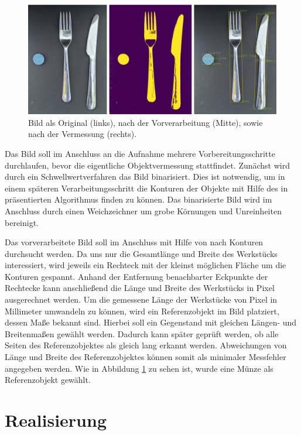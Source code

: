 \documentclass[twocolumn,10pt]{asme2ej}
\begin{document}
\begin{figure}
	\includegraphics[scale=0.07	]{output.png}
	\caption[center]{Bild als Original (links), nach der Vorverarbeitung (Mitte), sowie nach der Vermessung (rechts). }
	\label{fig:intro}
\end{figure}


Das Bild soll im Anschluss an die Aufnahme mehrere Vorbereitungsschritte durchlaufen, bevor die eigentliche Objektvermessung stattfindet. Zunächst wird durch ein Schwellwertverfahren das Bild binarisiert. Dies ist notwendig, um in einem späteren Verarbeitungsschritt die Konturen der Objekte mit Hilfe des in \cite{Suzuki1985TopologicalSA} präsentierten Algorithmus finden zu können. Das binarisierte Bild wird im Anschluss durch einen Weichzeichner um grobe Körnungen und Unreinheiten bereinigt. 

Das vorverarbeitete Bild soll im Anschluss mit Hilfe von \cite{Suzuki1985TopologicalSA} nach Konturen durchsucht werden. Da uns nur die Gesamtlänge und Breite des Werkstücks interessiert, wird jeweils ein Rechteck mit der kleinst möglichen Fläche um die Konturen gespannt. Anhand der Entfernung benachbarter Eckpunkte der Rechtecke kann anschließend die Länge und Breite des Werkstücks in Pixel ausgerechnet werden. Um die gemessene Länge der Werkstücke von Pixel in Millimeter umwandeln zu können, wird ein Referenzobjekt im Bild platziert, dessen Maße bekannt sind. Hierbei soll ein Gegenstand mit gleichen Längen- und Breitenmaßen gewählt werden. Dadurch kann später geprüft werden, ob  alle Seiten des Referenzobjektes als gleich lang erkannt werden. Abweichungen von Länge und Breite des Referenzobjektes können somit als minimaler Messfehler angegeben werden. Wie in Abbildung \ref{fig:intro} zu sehen ist, wurde eine Münze als Referenzobjekt gewählt.

\section{Realisierung}
\end{document}
